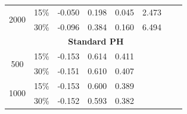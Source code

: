 \documentclass[11pt]{article}
\begin{document}
\begin{table}[h]
\begin{adjustbox}{max width=\textwidth, center}
\begin{tabular}{cc|rrrrll}
\multicolumn{1}{|c|}{\multirow{2}{*}{2000}} & 15\%                  & \multicolumn{1}{r|}{-0.050}                  & \multicolumn{1}{r|}{0.198}                   & \multicolumn{1}{r|}{0.045}                   & \multicolumn{1}{r|}{2.473}                     &                                              &                                              \\ \cline{2-6}
\multicolumn{1}{|c|}{}                      & 30\%                  & \multicolumn{1}{r|}{-0.096}                  & \multicolumn{1}{r|}{0.384}                   & \multicolumn{1}{r|}{0.160}                   & \multicolumn{1}{r|}{6.494}                     &                                              &                                              \\ \cline{1-6}
\multicolumn{1}{l}{}                        & \multicolumn{1}{l|}{} & \multicolumn{3}{c|}{\textbf{Standard PH}}                                                                                                  & \multicolumn{1}{l}{}                           &                                              &                                              \\ \cline{1-5}
\multicolumn{1}{|c|}{\multirow{2}{*}{500}}  & 15\%                  & \multicolumn{1}{r|}{-0.153}                  & \multicolumn{1}{r|}{0.614}                   & \multicolumn{1}{r|}{0.411}                   & \multicolumn{1}{l}{}                           &                                              &                                              \\ \cline{2-5}
\multicolumn{1}{|c|}{}                      & 30\%                  & \multicolumn{1}{r|}{-0.151}                  & \multicolumn{1}{r|}{0.610}                   & \multicolumn{1}{r|}{0.407}                   & \multicolumn{1}{l}{}                           &                                              &                                              \\ \cline{1-5}
\multicolumn{1}{|c|}{\multirow{2}{*}{1000}} & 15\%                  & \multicolumn{1}{r|}{-0.153}                  & \multicolumn{1}{r|}{0.600}                   & \multicolumn{1}{r|}{0.389}                   & \multicolumn{1}{l}{}                           &                                              &                                              \\ \cline{2-5}
\multicolumn{1}{|c|}{}                      & 30\%                  & \multicolumn{1}{r|}{-0.152}                  & \multicolumn{1}{r|}{0.593}                   & \multicolumn{1}{r|}{0.382}                   & \multicolumn{1}{l}{}                           &                                              &                                              \\ \cline{1-5}

\end{tabular}
\end{adjustbox}
\end{table}
\end{document}
